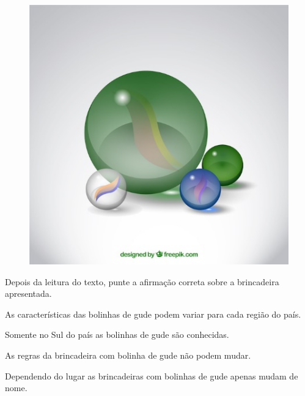 \begin{figure}[htpb!]
\includegraphics[width=\textwidth]{./imgs/img10.jpg}
\end{figure}

Depois da leitura do texto, punte a afirmação correta sobre a
brincadeira apresentada.

\begin{escolha}
\item
  As características das bolinhas de gude podem variar para cada região
  do país.
\item
  Somente no Sul do país as bolinhas de gude são conhecidas.
\item
  As regras da brincadeira com bolinha de gude não podem mudar.
\item
  Dependendo do lugar as brincadeiras com bolinhas de gude apenas mudam
  de nome.
\end{escolha}


